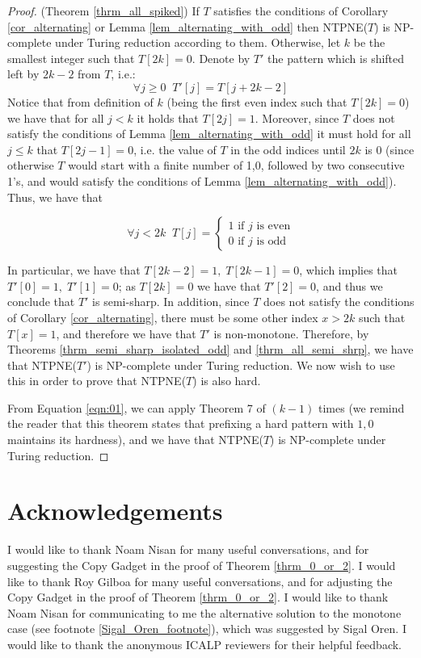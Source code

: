 \documentclass[runningheads]{llncs}
\begin{document}
\begin{proof} (Theorem \ref{thrm_all_spiked})
If $T$ satisfies the conditions of Corollary \ref{cor_alternating} or Lemma \ref{lem_alternating_with_odd} then NTPNE($T$) is NP-complete under Turing reduction according to them. Otherwise, let $k$ be the smallest integer such that $T[2k]=0$. Denote by $T'$ the pattern which is shifted left by $2k-2$ from $T$, i.e.:
\[\forall j\geq 0\;\; T'[j]=T[j+2k-2]\]
Notice that from definition of $k$ (being the first even index such that $T[2k]=0$) we have that for all $j<k$ it holds that $T[2j]=1$. Moreover, since $T$ does not satisfy the conditions of Lemma \ref{lem_alternating_with_odd} it must hold for all $j\leq k$ that $T[2j-1]=0$, i.e. the value of $T$ in the odd indices until $2k$ is 0 (since otherwise $T$ would start with a finite number of 1,0, followed by two consecutive 1's, and would satisfy the conditions of Lemma \ref{lem_alternating_with_odd}). Thus, we have that

\begin{equation}
\label{eqn:01}
\forall j<2k \;\; T[j]=
    \begin{cases}
        1 \text{ if $j$ is even}\\
        0 \text{ if $j$ is odd}
    \end{cases}
\end{equation}

In particular, we have that $T[2k-2]=1,\; T[2k-1]=0$, which implies that $T'[0]=1,\;T'[1]=0$; as $T[2k]=0$ we have that $T'[2]=0$, and thus we conclude that $T'$ is semi-sharp. In addition, since $T$ does not satisfy the conditions of Corollary \ref{cor_alternating}, there must be some other index $x>2k$ such that $T[x]=1$, and therefore we have that $T'$ is non-monotone. Therefore, by Theorems \ref{thrm_semi_sharp_isolated_odd} and \ref{thrm_all_semi_shrp}, we have that NTPNE($T'$) is NP-complete under Turing reduction. We now wish to use this in order to prove that NTPNE($T$) is also hard.

From Equation \ref{eqn:01}, we can apply Theorem 7 of \cite{Gilboa_Nisan_public_goods} $(k-1)$ times (we remind the reader that this theorem states that prefixing a hard pattern with $1,0$ maintains its hardness), and we have that NTPNE($T$) is NP-complete under Turing reduction.
\end{proof}

\section*{Acknowledgements}
I would like to thank Noam Nisan for many useful conversations, and for suggesting the Copy Gadget in the proof of Theorem \ref{thrm_0_or_2}.
I would like to thank Roy Gilboa for many useful conversations, and for adjusting the Copy Gadget in the proof of Theorem \ref{thrm_0_or_2}.
I would like to thank Noam Nisan for communicating to me the alternative solution to the monotone case (see footnote \ref{Sigal_Oren_footnote}), which was suggested by Sigal Oren.
I would like to thank the anonymous ICALP reviewers for their helpful feedback.



\end{document}
